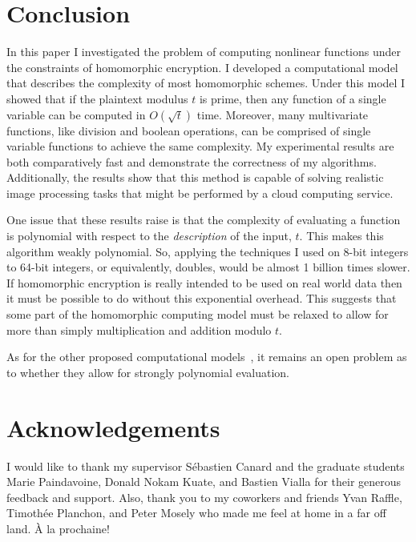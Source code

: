 \documentclass{article}
\begin{document}
    \section{Conclusion}
    \label{conc}

    In this paper I investigated the problem of computing nonlinear functions under the constraints of homomorphic encryption.
    I developed a computational model that describes the complexity of most homomorphic schemes.
    Under this model I showed that if the plaintext modulus $t$ is prime, then any function of a single variable can be computed in $O(\sqrt{t})$ time.
    Moreover, many multivariate functions, like division and boolean operations, can be comprised of single variable functions to achieve the same complexity.
    My experimental results are both comparatively fast and demonstrate the correctness of my algorithms.
    Additionally, the results show that this method is capable of solving realistic image processing tasks that might be performed by a cloud computing service.

    One issue that these results raise is that the complexity of evaluating a function is polynomial with respect to the \emph{description} of the input, $t$. This makes this algorithm weakly polynomial.
    So, applying the techniques I used on 8-bit integers to 64-bit integers, or equivalently, doubles, would be almost 1 billion times slower.
    If homomorphic encryption is really intended to be used on real world data then it must be possible to do without this exponential overhead.
    This suggests that some part of the homomorphic computing model must be relaxed to allow for more than
    simply multiplication and addition modulo $t$.

    As for the other proposed computational models~\cite{newton,fixedpoint,aes,genomic},
    it remains an open problem as to whether they allow for strongly polynomial evaluation.

    \section{Acknowledgements}

    I would like to thank my supervisor S{\'e}bastien Canard and
    the graduate students
    Marie Paindavoine,
    Donald Nokam Kuate, and
    Bastien Vialla for their generous feedback and support.
    Also, thank you to my coworkers and friends
    Yvan Raffle,
    Timoth{\'e}e Planchon,
    and
    Peter Mosely
    who made me feel at home in a far off land.
    {\`A} la prochaine!
\end{document}
